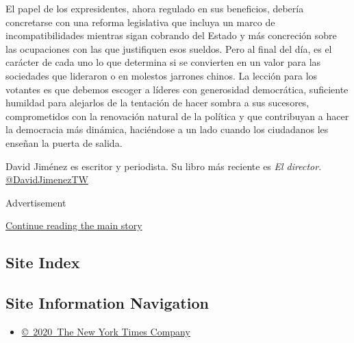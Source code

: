El papel de los expresidentes, ahora regulado en sus beneficios, debería
concretarse con una reforma legislativa que incluya un marco de
incompatibilidades mientras sigan cobrando del Estado y más concreción
sobre las ocupaciones con las que justifiquen esos sueldos. Pero al
final del día, es el carácter de cada uno lo que determina si se
convierten en un valor para las sociedades que lideraron o en molestos
jarrones chinos. La lección para los votantes es que debemos escoger a
líderes con generosidad democrática, suficiente humildad para alejarlos
de la tentación de hacer sombra a sus sucesores, comprometidos con la
renovación natural de la política y que contribuyan a hacer la
democracia más dinámica, haciéndose a un lado cuando los ciudadanos les
enseñan la puerta de salida.

David Jiménez es escritor y periodista. Su libro más reciente es
\emph{El director}.
\href{https://twitter.com/DavidJimenezTW}{@DavidJimenezTW}

Advertisement

\protect\hyperlink{after-bottom}{Continue reading the main story}

\hypertarget{site-index}{%
\subsection{Site Index}\label{site-index}}

\hypertarget{site-information-navigation}{%
\subsection{Site Information
Navigation}\label{site-information-navigation}}

\begin{itemize}
\tightlist
\item
  \href{https://help.nytimes3xbfgragh.onion/hc/en-us/articles/115014792127-Copyright-notice}{©~2020~The
  New York Times Company}
\end{itemize}

